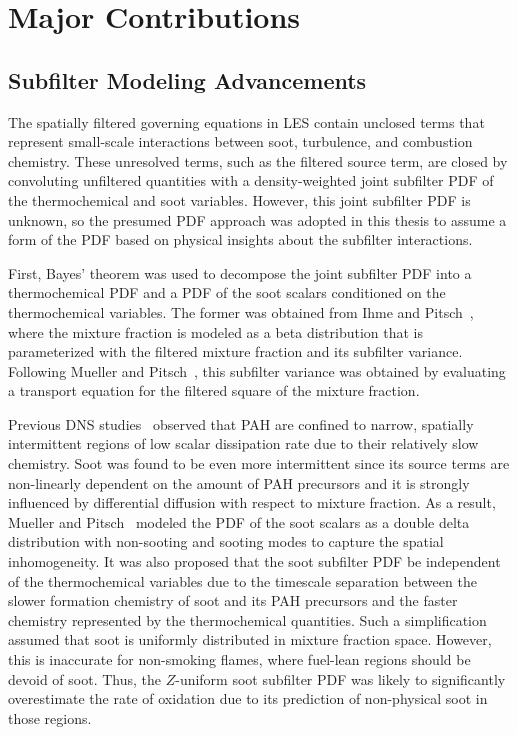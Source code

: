 \section{Major Contributions}
\label{sec:conclusion:contributions}

\subsection{Subfilter Modeling Advancements}
\label{sec:conclusion:contributions:subfilter}

The spatially filtered governing equations in LES contain unclosed terms that represent small-scale interactions between soot, turbulence, and combustion chemistry. These unresolved terms, such as the filtered source term, are closed by convoluting unfiltered quantities with a density-weighted joint subfilter PDF of the thermochemical and soot variables. However, this joint subfilter PDF is unknown, so the presumed PDF approach was adopted in this thesis to assume a form of the PDF based on physical insights about the subfilter interactions.

First, Bayes' theorem was used to decompose the joint subfilter PDF into a thermochemical PDF and a PDF of the soot scalars conditioned on the thermochemical variables. The former was obtained from Ihme and Pitsch~\cite{ihme2008}, where the mixture fraction is modeled as a beta distribution that is parameterized with the filtered mixture fraction and its subfilter variance. Following Mueller and Pitsch~\cite{mueller2012}, this subfilter variance was obtained by evaluating a transport equation for the filtered square of the mixture fraction. 

Previous DNS studies~\cite{bisetti2012,attili2014,attili2015} observed that PAH are confined to narrow, spatially intermittent regions of low scalar dissipation rate due to their relatively slow chemistry. Soot was found to be even more intermittent since its source terms are non-linearly dependent on the amount of PAH precursors and it is strongly influenced by differential diffusion with respect to mixture fraction. As a result, Mueller and Pitsch~\cite{subfilterpdf2011} modeled the PDF of the soot scalars as a double delta distribution with non-sooting and sooting modes to capture the spatial inhomogeneity. It was also proposed that the soot subfilter PDF be independent of the thermochemical variables due to the timescale separation between the slower formation chemistry of soot and its PAH precursors and the faster chemistry represented by the thermochemical quantities. Such a simplification assumed that soot is uniformly distributed in mixture fraction space. However, this is inaccurate for non-smoking flames, where fuel-lean regions should be devoid of soot. Thus, the $Z$-uniform soot subfilter PDF was likely to significantly overestimate the rate of oxidation due to its prediction of non-physical soot in those regions.

